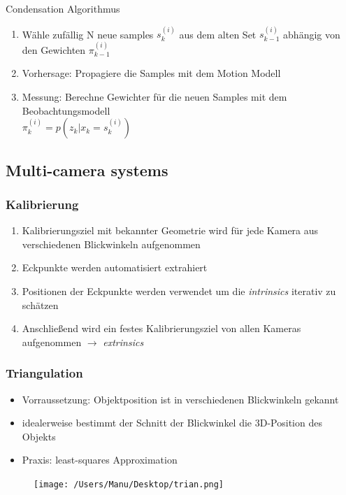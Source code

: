 \documentclass[paper=a4, fontsize=11pt]{scrartcl} %
\numberwithin{equation}{section} %
\numberwithin{figure}{section} %
\numberwithin{table}{section} %
\begin{document}
Condensation Algorithmus
\begin{enumerate}
\item Wähle zufällig N neue samples $s_k^{(i)}$ aus dem alten Set $s_{k-1}^{(i)}$ abhängig von den Gewichten $\pi_{k-1}^{(i)}$
\item Vorhersage: Propagiere die Samples mit dem Motion Modell
\item Messung: Berechne Gewichter für die neuen Samples mit dem Beobachtungsmodell\\ 
$\pi_k^{(i)} = p(z_k|x_k = s_k^{(i)})$
\end{enumerate}


\subsection{Multi-camera systems}

\subsubsection{Kalibrierung}

\begin{enumerate}
\item Kalibrierungsziel mit bekannter Geometrie wird für jede Kamera aus verschiedenen Blickwinkeln aufgenommen
\item Eckpunkte werden automatisiert extrahiert
\item Positionen der Eckpunkte werden verwendet um die \textit{intrinsics} iterativ zu schätzen
\item Anschließend wird ein festes Kalibrierungsziel von allen Kameras aufgenommen $\rightarrow$ \textit{extrinsics}
\end{enumerate}

\subsubsection{Triangulation}

\begin{minipage}{0.7\textwidth}
\begin{itemize}
\item Vorraussetzung: Objektposition ist in verschiedenen Blickwinkeln gekannt
\item idealerweise bestimmt der Schnitt der Blickwinkel die 3D-Position des Objekts
\item Praxis: least-squares Approximation
\end{itemize}
\end{minipage} \hfill
\begin{minipage}{0.25\textwidth}
\begin{figure}[H]
\texttt{[image: /Users/Manu/Desktop/trian.png]}
\end{figure}
\end{minipage}
\end{document}
